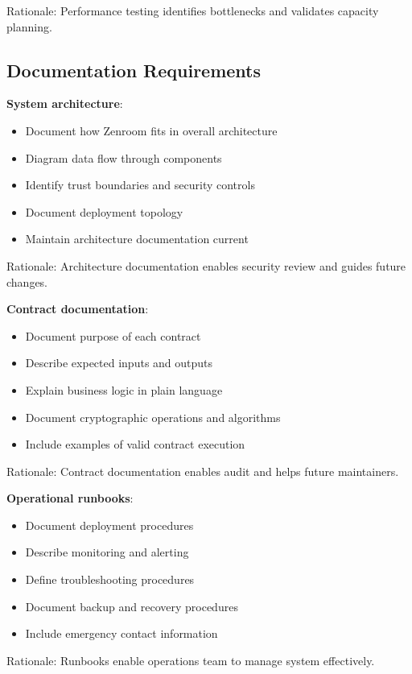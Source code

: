 Rationale: Performance testing identifies bottlenecks and validates
capacity planning.

\subsection{Documentation Requirements}

\textbf{System architecture}:

\begin{itemize}
\item Document how Zenroom fits in overall architecture
\item Diagram data flow through components
\item Identify trust boundaries and security controls
\item Document deployment topology
\item Maintain architecture documentation current
\end{itemize}

Rationale: Architecture documentation enables security review and
guides future changes.

\textbf{Contract documentation}:

\begin{itemize}
\item Document purpose of each contract
\item Describe expected inputs and outputs
\item Explain business logic in plain language
\item Document cryptographic operations and algorithms
\item Include examples of valid contract execution
\end{itemize}

Rationale: Contract documentation enables audit and helps future
maintainers.

\textbf{Operational runbooks}:

\begin{itemize}
\item Document deployment procedures
\item Describe monitoring and alerting
\item Define troubleshooting procedures
\item Document backup and recovery procedures
\item Include emergency contact information
\end{itemize}

Rationale: Runbooks enable operations team to manage system
effectively.

